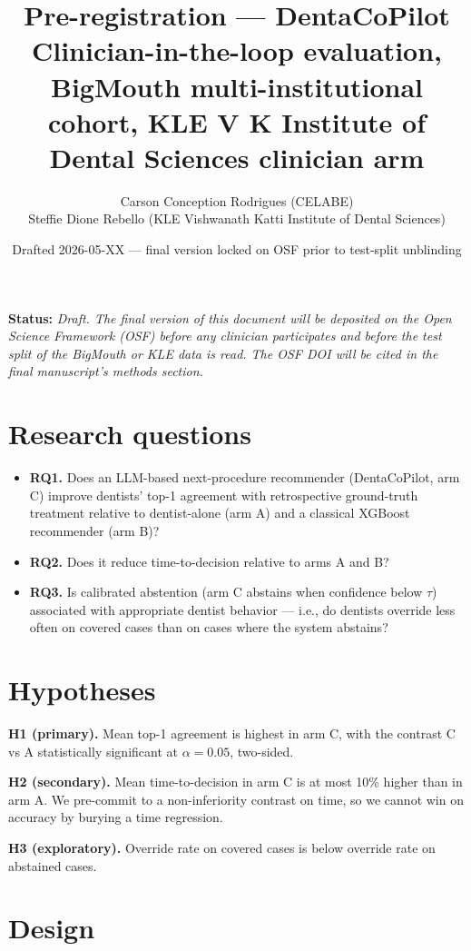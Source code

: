 \documentclass[11pt,letterpaper]{article}
\title{\textbf{Pre-registration --- DentaCoPilot}\\
\large Clinician-in-the-loop evaluation, BigMouth multi-institutional cohort,
KLE V K Institute of Dental Sciences clinician arm}
\author{Carson Conception Rodrigues (CELABE) \\
Steffie Dione Rebello (KLE Vishwanath Katti Institute of Dental Sciences)}
\date{Drafted 2026-05-XX --- final version locked on OSF prior to test-split unblinding}
\begin{document}
\maketitle

\noindent\textbf{Status:} \textit{Draft. The final version of this document
will be deposited on the Open Science Framework (OSF) before any clinician
participates and before the test split of the BigMouth or KLE data is read.
The OSF DOI will be cited in the final manuscript's methods section.}

\section{Research questions}

\begin{itemize}
    \item \textbf{RQ1.} Does an LLM-based next-procedure recommender
    (DentaCoPilot, arm C) improve dentists' top-1 agreement with retrospective
    ground-truth treatment relative to dentist-alone (arm A) and a classical
    XGBoost recommender (arm B)?
    \item \textbf{RQ2.} Does it reduce time-to-decision relative to arms A and B?
    \item \textbf{RQ3.} Is calibrated abstention (arm C abstains when
    confidence below $\tau$) associated with appropriate dentist behavior ---
    i.e., do dentists override less often on covered cases than on cases where
    the system abstains?
\end{itemize}

\section{Hypotheses}

\textbf{H1 (primary).} Mean top-1 agreement is highest in arm C, with the
contrast C vs A statistically significant at $\alpha = 0.05$, two-sided.

\textbf{H2 (secondary).} Mean time-to-decision in arm C is at most 10\%
higher than in arm A. We pre-commit to a non-inferiority contrast on time, so
we cannot win on accuracy by burying a time regression.

\textbf{H3 (exploratory).} Override rate on covered cases is below override
rate on abstained cases.

\section{Design}
\end{document}
